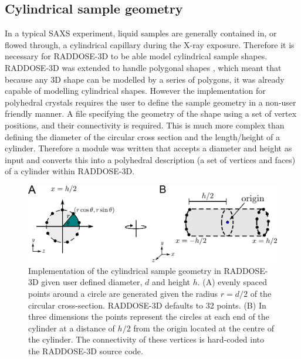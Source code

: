 \subsection{Cylindrical sample geometry}
\label{sub:Cylindrical sample geometry}
In a typical SAXS experiment, liquid samples are generally contained in, or flowed through, a cylindrical capillary during the X-ray exposure.
Therefore it is necessary for RADDOSE-3D to be able model cylindrical sample shapes.
RADDOSE-3D was extended to handle polygonal shapes \cite{bury2015radiation}, which meant that because any 3D shape can be modelled by a series of polygons, it was already capable of modelling cylindrical shapes.
However the implementation for polyhedral crystals requires the user to define the sample geometry in a non-user friendly manner.
A file specifying the geometry of the shape using a set of vertex positions, and their connectivity is required.
This is much more complex than defining the diameter of the circular cross section and the length/height of a cylinder.
Therefore a module was written that accepts a diameter and height as input and converts this into a polyhedral description (a set of vertices and faces) of a cylinder within RADDOSE-3D.
\begin{figure}
    \centering
    \includegraphics[width=1\textwidth]{figures/saxs/cylinder_implementation.pdf}
    \caption{Implementation of the cylindrical sample geometry in RADDOSE-3D given user defined diameter, $d$ and height $h$. (A) evenly spaced points around a circle are generated given the radius $r = d/2$ of the circular cross-section. RADDOSE-3D defaults to 32 points. (B) In three dimensions the points represent the circles at each end of the cylinder at a distance of $h/2$ from the origin located at the centre of the cylinder. The connectivity of these vertices is hard-coded into the RADDOSE-3D source code.}
    \label{fig:Cylindrical implementation}
\end{figure}

